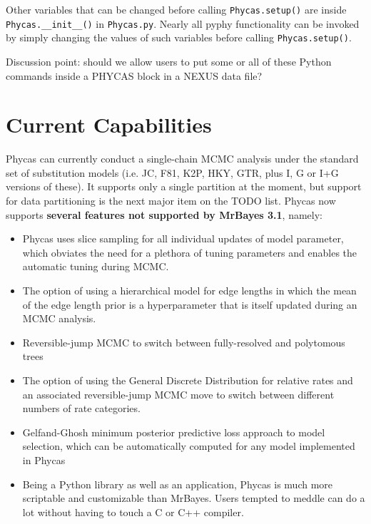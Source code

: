 \documentclass[10pt]{article}
\begin{document}
Other variables that can be changed before calling \verb+Phycas.setup()+ are inside \verb+Phycas.__init__()+ in {\tt Phycas.py}. Nearly all pyphy functionality can be invoked by simply changing the values of such variables before calling \verb+Phycas.setup()+.

Discussion point: should we allow users to put some or all of these Python commands inside a PHYCAS block in a NEXUS data file?

\section{Current Capabilities}

Phycas can currently conduct a single-chain MCMC analysis under the standard set of substitution models (i.e. JC, F81, K2P, HKY, GTR, plus I, G or I+G versions of these). It supports only a single partition at the moment, but support for data partitioning is the next major item on the TODO list. Phycas now supports {\bfseries several features not supported by MrBayes 3.1}, namely:

\begin{itemize}
\item Phycas uses slice sampling \citep{Neal2003a} for all individual updates of model parameter, which obviates the need for a plethora of tuning parameters and enables the automatic tuning during MCMC.
\item The option of using a hierarchical model for edge lengths in which the mean of the edge length prior is a hyperparameter that is itself updated during an MCMC analysis.
\item Reversible-jump MCMC to switch between fully-resolved and polytomous trees \citep{LewisHolderHolsinger2005}
\item The option of using the General Discrete Distribution for relative rates \citep{KosakovskypondMuse2005} and an associated reversible-jump MCMC move to switch between different numbers of rate categories.
\item Gelfand-Ghosh minimum posterior predictive loss approach to model selection, which can be automatically computed for any model implemented in Phycas
\item Being a Python library as well as an application, Phycas is much more scriptable and customizable than MrBayes. Users tempted to meddle can do a lot without having to touch a C or C++ compiler.
\end{itemize}
\end{document}
